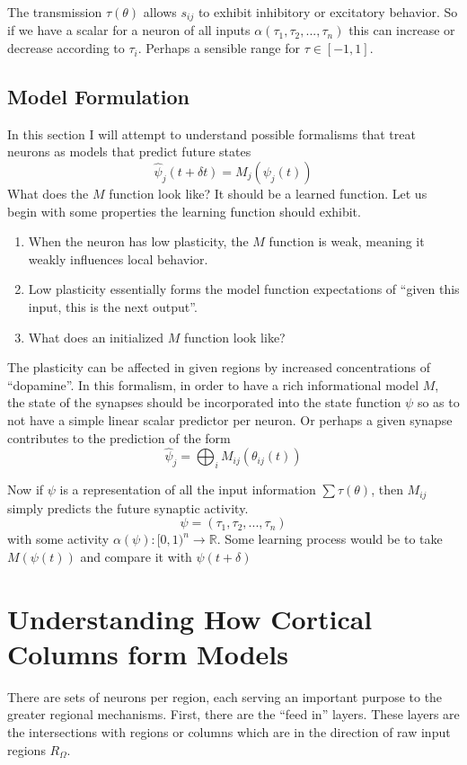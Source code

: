 \documentclass{article}
\begin{document}
The transmission $\tau(\theta)$ allows $s_{ij}$ to exhibit inhibitory or excitatory behavior. So if we have a scalar for a neuron of all inputs $\alpha(\tau_1, \tau_2,..., \tau_n)$ this can increase or decrease according to $\tau_i$. Perhaps a sensible range for $\tau \in [-1,1]$.

\subsection{Model Formulation}
In this section I will attempt to understand possible formalisms that treat neurons as models that predict future states
\begin{equation}
    \hat{\psi}_j(t+\delta t ) = M_j(\psi_j(t))
\end{equation}
What does the $M$ function look like? It should be a learned function. Let us begin with some properties the learning function should exhibit.
\begin{enumerate}
    \item When the neuron has low plasticity, the $M$ function is weak, meaning it weakly influences local behavior.
    \item Low plasticity essentially forms the model function expectations of ``given this input, this is the next output''.
    \item What does an initialized $M$ function look like?
\end{enumerate}
The plasticity can be affected in given regions by increased concentrations of ``dopamine''.
In this formalism, in order to have a rich informational model $M$, the state of the synapses should be incorporated into the state function $\psi$ so as to not have a simple linear scalar predictor per neuron. Or perhaps a given synapse contributes to the prediction of the form
\begin{equation}
    \hat{\psi}_j = \bigoplus_i M_{ij}(\theta_{ij}(t))
\end{equation}

Now if $\psi$ is a representation of all the input information $\sum \tau(\theta)$, then $M_{ij}$ simply predicts the future synaptic activity.
\begin{equation}
    \psi = ( \tau_1, \tau_2, ..., \tau_n)
\end{equation}
with some activity $\alpha(\psi): [0,1)^n \to \mathbb{R}$. Some learning process would be to take $M(\psi(t))$ and compare it with $\psi(t+\delta)$

\section{Understanding How Cortical Columns form Models}
There are sets of neurons per region, each serving an important purpose to the greater regional mechanisms. First, there are the ``feed in'' layers. These layers are the intersections with regions or columns which are in the direction of raw input regions $R_\Omega$. \\
\end{document}
